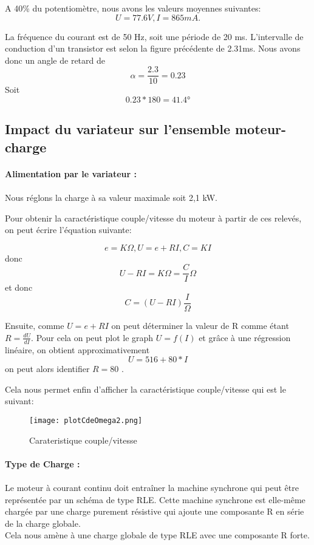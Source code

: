 \documentclass[oneside,a4paper,12pt]{article}
\begin{document}
	A 40\% du potentiomètre, nous avons les valeurs moyennes suivantes:
	$$U= 77.6 V,  I= 865 mA.$$
	
	La fréquence du courant est de 50 Hz, soit une période de 20 ms.
	L’intervalle de conduction d’un transistor est selon la figure précédente de 2.31ms. 
	Nous avons donc un angle de retard de $$\alpha=\frac{2.3}{10}=0.23$$ 
	Soit $$0.23*180 = 41.4°$$
	
	\subsection{Impact du variateur sur l’ensemble moteur-charge}
	\paragraph{Alimentation par le variateur :}
	\paragraph{}
	Nous réglons la charge à sa valeur maximale soit 2,1 kW.
	
	Pour obtenir la caractéristique couple/vitesse du moteur à partir de ces relevés, on peut écrire l’équation suivante: 
	
	$$ e=K\Omega, U=e+RI, C=KI $$
	donc $$ U-RI=K\Omega=\frac{C}{I}\Omega $$
	et donc $$ C=(U-RI)\frac{I}{\Omega} $$

	Ensuite, comme $U=e+RI$ on peut déterminer la valeur de R comme étant $R=\frac{dU}{dI}$.
	Pour cela on peut plot le graph $U=f(I)$ et grâce à une régression linéaire, on obtient approximativement     
	$$U = 516 + 80*I$$on peut alors identifier $R=80$ .
	
	Cela nous permet enfin d'afficher la caractéristique couple/vitesse qui est le suivant:
	\begin{figure}[h]
		\centering
		\texttt{[image: plotCdeOmega2.png]}
		\caption{Carateristique couple/vitesse}
	\end{figure}

	\paragraph{Type de Charge :}
	\paragraph{}
	
	Le moteur à courant continu doit entraîner la machine synchrone qui peut être représentée par un schéma de type RLE. Cette machine synchrone est elle-même chargée par une charge purement résistive qui ajoute une composante R en série de la charge globale.\\
	Cela nous amène à une charge globale de type RLE avec une composante R forte.
	
\end{document}
